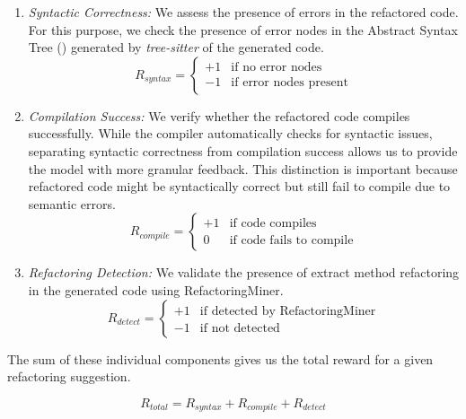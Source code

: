 \begin{enumerate}
    \item \textit{Syntactic Correctness:} We assess the presence of errors in the refactored code.
    For this purpose, we check the presence of error nodes in the Abstract Syntax Tree (\abst{}) generated by \textit{tree-sitter} of the generated code.
    \begin{equation} \label{eq:syntax}
        R_{syntax} = 
        \begin{cases}
            +1 & \text{if no error nodes} \\
            -1 & \text{if error nodes present}
        \end{cases}
    \end{equation}

    \item \textit{Compilation Success:} We verify whether the refactored code compiles successfully. While the compiler automatically checks for syntactic issues, separating syntactic correctness from compilation success allows us to provide the \rl{} model with more granular feedback. This distinction is important because refactored code might be syntactically correct but still fail to compile due to semantic errors.
    \begin{equation} \label{eq:compile}
        R_{compile} = 
        \begin{cases}
            +1 & \text{if code compiles} \\
            0 & \text{if code fails to compile}
        \end{cases}
    \end{equation}

    \item \textit{Refactoring Detection:} We validate the presence of extract method refactoring in the generated code using RefactoringMiner.
    \begin{equation} \label{eq: detect}
        R_{detect} = 
        \begin{cases}
            +1 & \text{if detected by RefactoringMiner} \\
            -1 & \text{if not detected}
        \end{cases}
    \end{equation}
\end{enumerate}

The sum of these individual components gives us the total reward for a given refactoring suggestion.

\begin{equation}
    R_{total} = R_{syntax} + R_{compile} + R_{detect}
\end{equation}

